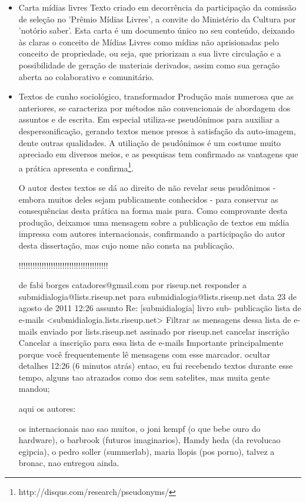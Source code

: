 \begin{itemize}
    \item Carta mídias livres
Texto criado em decorrência da participação da comissão de seleção no
'Prêmio Mídias Livres', a convite do Ministério da Cultura por 'notório saber'.
Esta carta é um documento único no seu conteúdo, deixando às claras
o conceito de Mídias Livres como mídias não aprisionadas pelo conceito
de propriedade, ou seja, que priorizam a sua livre circulação e a possibilidade
de geração de materiais derivados, assim como sua geração aberta ao colaborativo e comunitário.

    \item Textos de cunho sociológico, transformador
Produção mais numerosa que as anteriores, se caracteriza por métodos não convencionais
de abordagem dos assuntos e de escrita. Em especial utiliza-se pseudônimos para
auxiliar a despersonificação, gerando textos menos presos à satisfação da auto-imagem, dente
outras qualidades. A utiliação de psudônimos é um costume muito apreciado em diversos meios,
e as pesquisas tem confirmado as vantagens que a prática apresenta e confirma\footnote{http://disqus.com/research/pseudonyms/}.

O autor destes textos se dá ao direito de não revelar seus psudônimos - embora muitos deles
sejam publicamente conhecidos - para conservar as consequências desta prática na
forma mais pura. Como comprovante desta produção, deixamos uma mensagem sobre a publicação
de textos em mídia impressa com autores internacionais,
confirmando a participação do autor desta dissertação, mas cujo
nome não consta na publicação.

!!!!!!!!!!!!!!!!!!!!!!!!!!!!!!!!!!!!!!!

de      fabi borges catadores@gmail.com por  riseup.net 
responder a     submidialogia@lists.riseup.net
para    submidialogia@lists.riseup.net
data    23 de agosto de 2011 12:26
assunto Re: [submidialogia] livro sub- publicação
lista de e-mails        <submidialogia.lists.riseup.net> Filtrar as mensagens dessa lista de e-mails
enviado por     lists.riseup.net
assinado por    riseup.net
cancelar inscrição      Cancelar a inscrição para essa lista de e-mails
        Importante principalmente porque você frequentemente lê mensagens com esse marcador.
ocultar detalhes 12:26 (6 minutos atrás)
entao, eu fui recebendo textos durante esse tempo,
alguns tao atrazados como dos sem satelites, mas muita gente mandou;

aqui os autores:

os internacionais nao sao muitos, o joni kempf (o que bebe ouro do hardware), o barbrook (futuros imaginarios),
Hamdy heda (da revolucao egipcia), o pedro soller (summerlab), maria llopis (pos porno),  talvez a bronac, nao entregou ainda.


\end{itemize}
